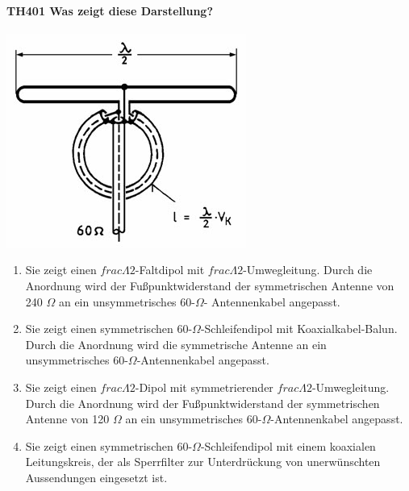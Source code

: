 \documentclass[8pt]{article}
\begin{document}
\paragraph*{TH401 Was zeigt diese Darstellung?} 
\begin{center}
	\begin{minipage}{\linewidth}
		\centering
		\includegraphics[scale=1.0]{pics/th401_a.jpg}
	\end{minipage}
\end{center}
\begin{enumerate}[nolistsep,label=\Alph*]
\item Sie zeigt einen $frac{\Lambda}{2}$-Faltdipol mit $frac{\Lambda}{2}$-Umwegleitung. Durch die Anordnung wird der Fußpunktwiderstand der symmetrischen Antenne von 240 $\Omega$ an ein unsymmetrisches 60-$\Omega$- Antennenkabel angepasst.
\item Sie zeigt einen symmetrischen 60-$\Omega$-Schleifendipol mit Koaxialkabel-Balun. Durch die Anordnung wird die symmetrische Antenne an ein unsymmetrisches 60-$\Omega$-Antennenkabel angepasst.
\item Sie zeigt einen $frac{\Lambda}{2}$-Dipol mit symmetrierender $frac{\Lambda}{2}$-Umwegleitung. Durch die Anordnung wird der Fußpunktwiderstand der symmetrischen Antenne von 120 $\Omega$ an ein unsymmetrisches 60-$\Omega$-Antennenkabel angepasst.
\item Sie zeigt einen symmetrischen 60-$\Omega$-Schleifendipol mit einem koaxialen Leitungskreis, der als Sperrfilter zur Unterdrückung von unerwünschten Aussendungen eingesetzt ist.
\end{enumerate}
\end{document}
